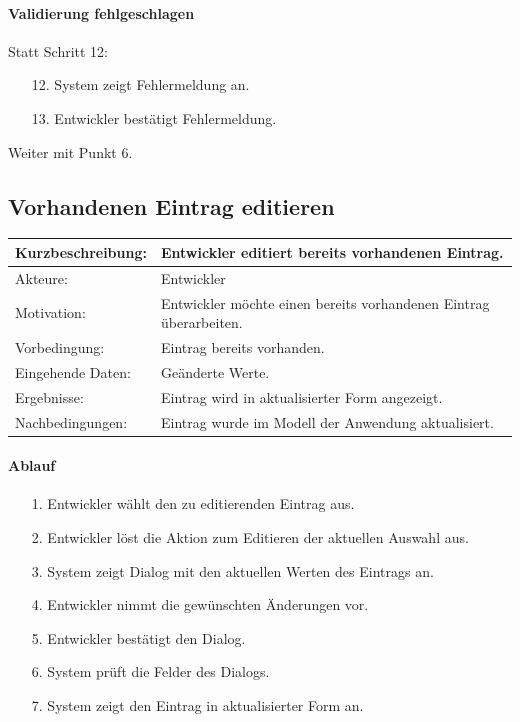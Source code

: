 \paragraph{Validierung fehlgeschlagen}
Statt Schritt 12:
\begin{itemize}
\item[12.] System zeigt Fehlermeldung an. 
\item[13.] Entwickler bestätigt Fehlermeldung. 
\end{itemize}
Weiter mit Punkt 6. 


\subsection{Vorhandenen Eintrag editieren}
\label{sec:edit_entry}

\begin{tabular}[h]{|p{4cm}|p{}|}
\hline 
\rule[-1ex]{0pt}{2.5ex}Kurzbeschreibung: & 
Entwickler editiert bereits vorhandenen Eintrag. \\  
\hline 
\rule[-1ex]{0pt}{2.5ex}Akteure: & 
Entwickler \\ 
\hline 
\rule[-1ex]{0pt}{2.5ex}Motivation: & 
Entwickler möchte einen bereits vorhandenen Eintrag überarbeiten. \\ 
\hline 
\rule[-1ex]{0pt}{2.5ex}Vorbedingung: & 
Eintrag bereits vorhanden. \\ 
\hline 
\rule[-1ex]{0pt}{2.5ex}Eingehende Daten: & Geänderte Werte. \\ 
\hline 
\rule[-1ex]{0pt}{2.5ex}Ergebnisse: & Eintrag wird in aktualisierter Form angezeigt. \\ 
\hline 
\rule[-1ex]{0pt}{2.5ex}Nachbedingungen: & Eintrag wurde im Modell der Anwendung aktualisiert.  \\ 
\hline 
\end{tabular} 

\paragraph{Ablauf}

\begin{itemize}[itemsep=0pt]
\item[1.] Entwickler wählt den zu editierenden Eintrag aus.
\item[2.] Entwickler löst die Aktion zum Editieren der aktuellen Auswahl aus. 
\item[3.] System zeigt Dialog mit den aktuellen Werten des Eintrags an.
\item[4.] Entwickler nimmt die gewünschten Änderungen vor.
\item[5.] Entwickler bestätigt den Dialog.
\item[6.] System prüft die Felder des Dialogs.
\item[7.] System zeigt den Eintrag in aktualisierter Form an.
\end{itemize}

